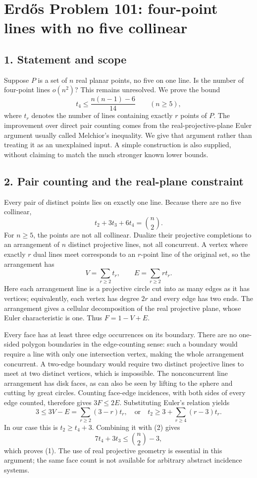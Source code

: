 \section*{Erd\H{o}s Problem 101: four-point lines with no five collinear}

\subsection*{1. Statement and scope}
Suppose $P$ is a set of $n$ real planar points, no five on one line. Is the number of four-point lines $o(n^2)$? This remains unresolved. We prove the bound
\[
 t_4\le\frac{n(n-1)-6}{14}\qquad(n\ge5),\tag{1}
\]
where $t_r$ denotes the number of lines containing exactly $r$ points of $P$. The improvement over direct pair counting comes from the real-projective-plane Euler argument usually called Melchior's inequality. We give that argument rather than treating it as an unexplained input. A simple construction is also supplied, without claiming to match the much stronger known lower bounds.

\subsection*{2. Pair counting and the real-plane constraint}
Every pair of distinct points lies on exactly one line. Because there are no five collinear,
\[
 t_2+3t_3+6t_4=\binom n2.\tag{2}
\]
For $n\ge5$, the points are not all collinear. Dualize their projective completions to an arrangement of $n$ distinct projective lines, not all concurrent. A vertex where exactly $r$ dual lines meet corresponds to an $r$-point line of the original set, so the arrangement has
\[
 V=\sum_{r\ge2}t_r,\qquad E=\sum_{r\ge2}r t_r.
\]
Here each arrangement line is a projective circle cut into as many edges as it has vertices; equivalently, each vertex has degree $2r$ and every edge has two ends. The arrangement gives a cellular decomposition of the real projective plane, whose Euler characteristic is one. Thus $F=1-V+E$.

Every face has at least three edge occurrences on its boundary. There are no one-sided polygon boundaries in the edge-counting sense: such a boundary would require a line with only one intersection vertex, making the whole arrangement concurrent. A two-edge boundary would require two distinct projective lines to meet at two distinct vertices, which is impossible. The nonconcurrent line arrangement has disk faces, as can also be seen by lifting to the sphere and cutting by great circles. Counting face-edge incidences, with both sides of every edge counted, therefore gives $3F\le2E$. Substituting Euler's relation yields
\[
 3\le3V-E=\sum_{r\ge2}(3-r)t_r,
 \quad\text{or}\quad
 t_2\ge3+\sum_{r\ge4}(r-3)t_r.\tag{3}
\]
In our case this is $t_2\ge t_4+3$. Combining it with (2) gives
\[
 7t_4+3t_3\le\binom n2-3,
\]
which proves (1). The use of real projective geometry is essential in this argument; the same face count is not available for arbitrary abstract incidence systems.

